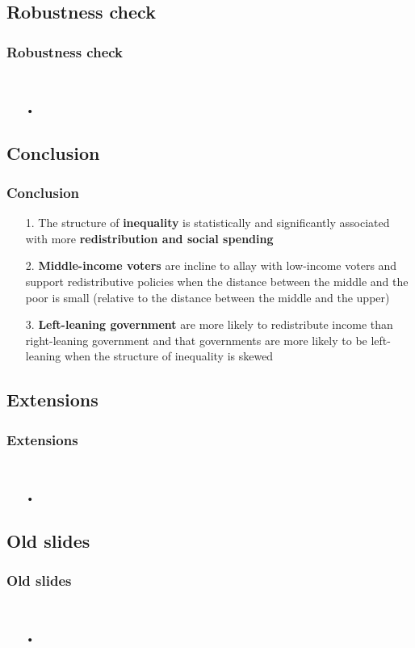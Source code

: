 \documentclass{beamer}
\begin{document}
\begin{frame}
\subsection{Robustness check} 
\frametitle{Robustness check}\
\begin{itemize}
\item[•]
\end{itemize}
\end{frame}
\begin{frame}
\subsection{Conclusion}
\frametitle{Conclusion}
\begin{itemize}
\item[1.] The structure of \textbf{inequality} is statistically and significantly associated with more \textbf{redistribution and social spending}
\medskip
\medskip
\medskip
\item[2.] \textbf{Middle-income voters} are incline to allay with low-income voters and support redistributive policies when the distance between the middle and the poor is small (relative to the distance between the middle and the upper)
\medskip
\medskip
\medskip
\item[3.] \textbf{Left-leaning government} are more likely to redistribute income than right-leaning government and that governments are more likely to be left-leaning when the structure of inequality is skewed
\end{itemize}
\end{frame}

\begin{frame}
\subsection{Extensions} 
\frametitle{Extensions}\
\begin{itemize}
\item[•]
\end{itemize}
\end{frame}

\begin{frame}
\subsection{Old slides} 
\frametitle{Old slides}\
\begin{itemize}
\item[•]
\end{itemize}
\end{frame}
\end{document}
